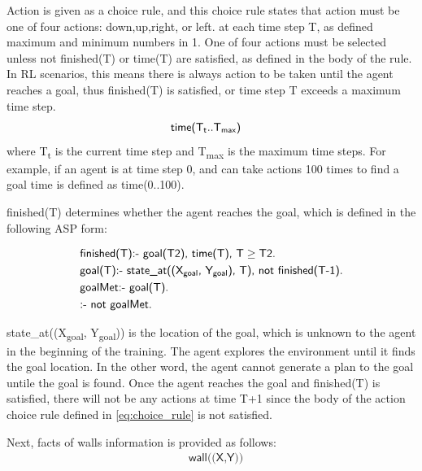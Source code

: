 Action is given as a choice rule, and this choice rule states that action must be one of four actions: \textsf{down},\textsf{up},\textsf{right}, or \textsf{left}.
at each time step T, as defined maximum and minimum numbers in 1.
One of four actions must be selected unless \textsf{not finished(T)} or \textsf{time(T)} are satisfied, as defined in the body of the rule.
In RL scenarios, this means there is always action to be taken until the agent reaches a goal, thus \textsf{finished(T)} is satisfied, or time step T exceeds a maximum time step.
\begin{equation}
\begin{split}
&\textsf{time(T\textsubscript{t}..T\textsubscript{max})}
\end{split}
\end{equation}
where T\textsubscript{t} is the current time step and T\textsubscript{max} is the maximum time steps.
For example, if an agent is at time step 0, and can take actions 100 times to find a goal time is defined as \textsf{time(0..100)}.

\textsf{finished(T)} determines whether the agent reaches the goal, which is defined in the following ASP form:

\begin{equation}\label{eq:asp_goal}
\begin{split}
&\textsf{finished(T):- goal(T2), time(T), T} \geq \textsf{T2.}\\
&\textsf{goal(T):- state\_at((X\textsubscript{goal}, Y\textsubscript{goal}), T), not finished(T-1).}\\
&\textsf{goalMet:- goal(T).}\\
&\textsf{:- not goalMet.}
\end{split}
\end{equation}

\textsf{state\_at((X\textsubscript{goal}, Y\textsubscript{goal}))} is the location of the goal, which is unknown to the agent in the beginning of the training.
The agent explores the environment until it finds the goal location.
In the other word, the agent cannot generate a plan to the goal untile the goal is found. 
Once the agent reaches the goal and \textsf{finished(T)} is satisfied, 
there will not be any actions at time T+1 since the body of the action choice rule defined in \ref{eq:choice_rule} is not satisfied.

Next, facts of walls information is provided as follows:
\begin{equation}
\begin{split}
&\textsf{wall((X,Y))}\\
\end{split}
\end{equation}

